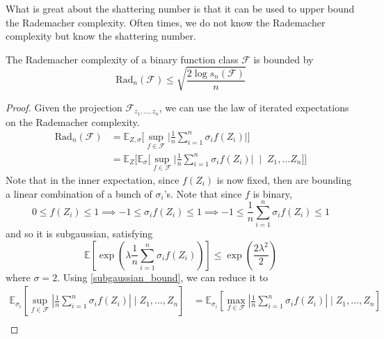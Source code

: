   What is great about the shattering number is that it can be used to upper bound the Rademacher complexity. Often times, we do not know the Rademacher complexity but know the shattering number. 

  \begin{theorem}
    The Rademacher complexity of a binary function class $\mathcal{F}$ is bounded by 
    \begin{equation}
      \mathrm{Rad}_n (\mathcal{F}) \leq \sqrt{\frac{2 \log s_n (\mathcal{F})}{n}}
    \end{equation}
  \end{theorem}
  \begin{proof}
    Given the projection $\mathcal{F}_{z_1, \ldots, z_n}$, we can use the law of iterated expectations on the Rademacher complexity. 
    \begin{align}
      \mathrm{Rad}_n (\mathcal{F}) & = \mathbb{E}_{Z, \sigma} \bigg[ \sup_{f \in \mathcal{F}} \bigg| \frac{1}{n} \sum_{i=1}^n \sigma_i f(Z_i) \bigg| \bigg] \\
                                   & = \mathbb{E}_{Z} \bigg[ \mathbb{E}_{\sigma} \bigg[ \sup_{f \in \mathcal{F}} \bigg| \frac{1}{n} \sum_{i=1}^n \sigma_i f(Z_i) \bigg| \; \mid \; Z_1, \ldots Z_n \bigg] \bigg] 
    \end{align}
    Note that in the inner expectation, since $f(Z_i)$ is now fixed, then are bounding a linear combination of a bunch of $\sigma_i$'s. Note that since $f$ is binary, 
    \begin{equation}
      0 \leq f(Z_i) \leq 1 \implies -1 \leq \sigma_i f(Z_i)\leq 1 \implies -1 \leq \frac{1}{n} \sum_{i=1}^n \sigma_i f(Z_i) \leq 1 
    \end{equation}
    and so it is subgaussian, satisfying 
    \begin{equation}
      \mathbb{E}\left[ \exp \left( \lambda \frac{1}{n} \sum_{i=1}^n \sigma_i f(Z_i) \right)\right] \leq \exp \left( \frac{2 \lambda^2}{2} \right)
    \end{equation}
    where $\sigma = 2$. Using \ref{subgaussian_bound}, we can reduce it to 
    \begin{align}
      \mathbb{E}_{\sigma_i} \left[ \sup_{f \in \mathcal{F}} \left| \frac{1}{n} \sum_{i=1}^n \sigma_i f(Z_i) \right| \mid Z_1, \ldots, Z_n \right] 
      & = \mathbb{E}_{\sigma_i} \left[ \max_{f \in \mathcal{F}} \left| \frac{1}{n} \sum_{i=1}^n \sigma_i f(Z_i) \right| \mid Z_1, \ldots, Z_n \right] \\

\end{align}
\end{proof}
